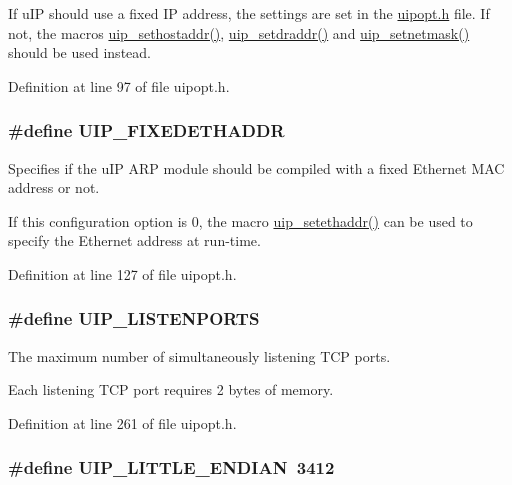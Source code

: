 If uIP should use a fixed IP address, the settings are set in the \hyperlink{uipopt_8h}{uipopt.h} file. If not, the macros \hyperlink{group__uipconffunc_ga12b467f314489259dd718228d0827a51}{uip\_\-sethostaddr()}, \hyperlink{group__uipconffunc_ga41d37ea1e3bd24f7b51e9409aceaaa80}{uip\_\-setdraddr()} and \hyperlink{group__uipconffunc_gaeb79c914cf137e6d27fd7583e5a66679}{uip\_\-setnetmask()} should be used instead. 

Definition at line 97 of file uipopt.h.

\hypertarget{group__uipopt_gae0f8cbeca9731af2171ffd37e79de893}{
\subsubsection[{UIP\_\-FIXEDETHADDR}]{\setlength{\rightskip}{0pt plus 5cm}\#define UIP\_\-FIXEDETHADDR}}
\label{group__uipopt_gae0f8cbeca9731af2171ffd37e79de893}
Specifies if the uIP ARP module should be compiled with a fixed Ethernet MAC address or not.

If this configuration option is 0, the macro \hyperlink{group__uipconffunc_ga30e827f33eacff55ecb4d8fb5a11d5d1}{uip\_\-setethaddr()} can be used to specify the Ethernet address at run-\/time. 

Definition at line 127 of file uipopt.h.

\hypertarget{group__uipopt_ga8f4ebd8ef6c0ea665ed351d87fec09fd}{
\subsubsection[{UIP\_\-LISTENPORTS}]{\setlength{\rightskip}{0pt plus 5cm}\#define UIP\_\-LISTENPORTS}}
\label{group__uipopt_ga8f4ebd8ef6c0ea665ed351d87fec09fd}
The maximum number of simultaneously listening TCP ports.

Each listening TCP port requires 2 bytes of memory. 

Definition at line 261 of file uipopt.h.

\hypertarget{group__uipopt_gab6e04358481bd2057524fb874cfa472b}{
\subsubsection[{UIP\_\-LITTLE\_\-ENDIAN}]{\setlength{\rightskip}{0pt plus 5cm}\#define UIP\_\-LITTLE\_\-ENDIAN~3412}}
\label{group__uipopt_gab6e04358481bd2057524fb874cfa472b}


